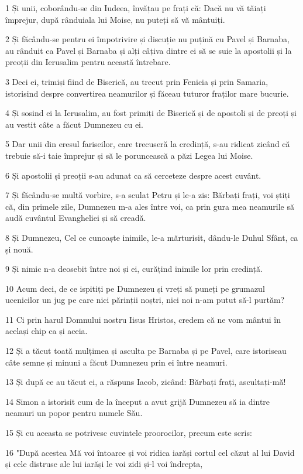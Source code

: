 \par 1 Și unii, coborându-se din Iudeea, învățau pe frați că: Dacă nu vă tăiați împrejur, după rânduiala lui Moise, nu puteți să vă mântuiți.
\par 2 Și făcându-se pentru ei împotrivire și discuție nu puțină cu Pavel și Barnaba, au rânduit ca Pavel și Barnaba și alți câțiva dintre ei să se suie la apostolii și la preoții din Ierusalim pentru această întrebare.
\par 3 Deci ei, trimiși fiind de Biserică, au trecut prin Fenicia și prin Samaria, istorisind despre convertirea neamurilor și făceau tuturor fraților mare bucurie.
\par 4 Și sosind ei la Ierusalim, au fost primiți de Biserică și de apostoli și de preoți și au vestit câte a făcut Dumnezeu cu ei.
\par 5 Dar unii din eresul fariseilor, care trecuseră la credință, s-au ridicat zicând că trebuie să-i taie împrejur și să le poruncească a păzi Legea lui Moise.
\par 6 Și apostolii și preoții s-au adunat ca să cerceteze despre acest cuvânt.
\par 7 Și făcându-se multă vorbire, s-a sculat Petru și le-a zis: Bărbați frați, voi știți că, din primele zile, Dumnezeu m-a ales între voi, ca prin gura mea neamurile să audă cuvântul Evangheliei și să creadă.
\par 8 Și Dumnezeu, Cel ce cunoaște inimile, le-a mărturisit, dându-le Duhul Sfânt, ca și nouă.
\par 9 Și nimic n-a deosebit între noi și ei, curățind inimile lor prin credință.
\par 10 Acum deci, de ce ispitiți pe Dumnezeu și vreți să puneți pe grumazul ucenicilor un jug pe care nici părinții noștri, nici noi n-am putut să-l purtăm?
\par 11 Ci prin harul Domnului nostru Iisus Hristos, credem că ne vom mântui în același chip ca și aceia.
\par 12 Și a tăcut toată mulțimea și asculta pe Barnaba și pe Pavel, care istoriseau câte semne și minuni a făcut Dumnezeu prin ei între neamuri.
\par 13 Și după ce au tăcut ei, a răspuns Iacob, zicând: Bărbați frați, ascultați-mă!
\par 14 Simon a istorisit cum de la început a avut grijă Dumnezeu să ia dintre neamuri un popor pentru numele Său.
\par 15 Și cu aceasta se potrivesc cuvintele proorocilor, precum este scris:
\par 16 "După acestea Mă voi întoarce și voi ridica iarăși cortul cel căzut al lui David și cele distruse ale lui iarăși le voi zidi și-l voi îndrepta,

